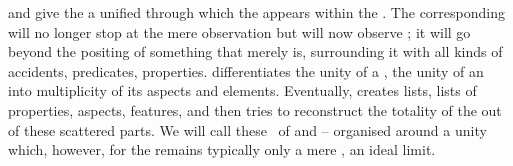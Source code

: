 \label{pa:rssA}
%
 and  give the  a unified 
through which the  appears within the \hoa.  The corresponding
 will no longer stop at the mere observation  but will now
observe ; it will go beyond the  positing
of something that merely is, surrounding it with all kinds of accidents,
predicates, properties.  differentiates the unity
of a , the unity of an  into multiplicity of its
aspects and elements.  Eventually,  creates lists, lists of
properties, aspects, features, and then tries to reconstruct the totality of the
 out of these scattered parts. We will call these \rss\ of
  and  --  organised
around a unity which, however, for the  remains
typically only a mere , an ideal limit.

